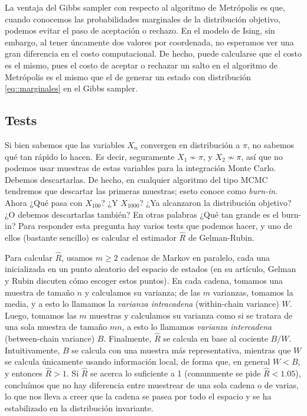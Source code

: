 \documentclass[a4paper, 12pt]{article}
\begin{document}
La ventaja del Gibbs sampler con respecto al algoritmo de Metrópolis es que, cuando conocemos las probabilidades marginales de la distribución objetivo, podemos evitar el paso de aceptación o rechazo. En el modelo de Ising, sin embargo, al tener úncamente dos valores por coordenada, no esperamos ver una gran diferencia en el costo computacional. De hecho, puede calcularse que el costo es el mismo, pues el costo de aceptar o rechazar un salto en el algoritmo de Metrópolis es el mismo que el de generar un estado con distribución \eqref{eq::marginales} en el Gibbs sampler. 

\subsection{Tests}

Si bien sabemos que las variables $X_n$ convergen en distribución a $\pi$, no sabemos qué tan rápido lo hacen. Es decir, seguramente $X_1 \not \sim \pi$, y $X_2 \not \sim \pi$, así que no podemos usar muestras de estas variables para la integración Monte Carlo. Debemos descartarlas. De hecho, en cualquier algoritmo del tipo MCMC tendremos que descartar las primeras muestras; eseto conoce como {\it burn-in}. Ahora ¿Qué pasa con $X_{100}$? ¿Y $X_{1000}$? ¿Ya alcanzaron la distribución objetivo? ¿O debemos descartarlas también? En otras palabras ¿Qué tan grande es el burn-in? Para responder esta pregunta hay varios tests que podemos hacer, y uno de ellos (bastante sencillo) es calcular el estimador $\hat{R}$ de Gelman-Rubin.

Para calcular $\hat{R}$, usamos $m \geq 2$ cadenas de Markov en paralelo, cada una inicializada en un punto aleatorio del espacio de estados (en su artículo, Gelman y Rubin discuten cómo escoger estos puntos). En cada cadena, tomamos una muestra de tamaño $n$ y calculamos su varianza; de las $m$ varianzas, tomamos la media, y a esto lo llamamos la {\it varianza intracadena} (within-chain variance) $W$. Luego, tomamos las $m$ muestras y calculamos su varianza como si se tratara de una sola muestra de tamaño $mn$, a esto lo llamamos {\it varianza intercadena} (between-chain variance) $B$. Finalmente, $\hat{R}$ se calcula en base al cociente $B / W$. Intuitivamente, $B$ se calcula con una muestra más representativa, mientras que $W$ se calcula únicamente usando información local, de forma que, en general $W < B$, y entonces $\hat{R} > 1$. Si $\hat{R}$ se acerca lo suficiente a 1 (comunmente se pide $\hat{R} < 1.05$), concluímos que no hay diferencia entre muestrear de una sola cadena o de varias, lo que nos lleva a creer que la cadena se pasea por todo el espacio y se ha estabilizado en la distribución invariante.\\
\end{document}
